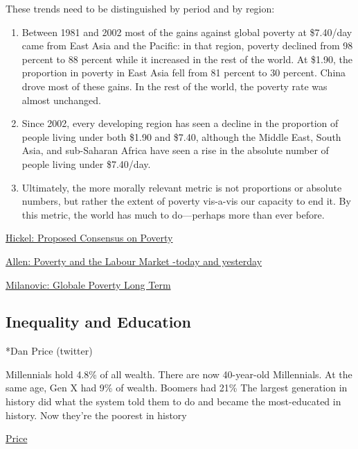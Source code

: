 \documentclass[
]{book}
\begin{document}
These trends need to be distinguished by period and by region:

\begin{enumerate}
\def\labelenumi{\arabic{enumi}.}
\setcounter{enumi}{7}
\item
  Between 1981 and 2002 most of the gains against global poverty at \$7.40/day came from East Asia and the Pacific: in that region, poverty declined from 98 percent to 88 percent while it increased in the rest of the world. At \$1.90, the proportion in poverty in East Asia fell from 81 percent to 30 percent. China drove most of these gains. In the rest of the world, the poverty rate was almost unchanged.
\item
  Since 2002, every developing region has seen a decline in the proportion of people living under both \$1.90 and \$7.40, although the Middle East, South Asia, and sub-Saharan Africa have seen a rise in the absolute number of people living under \$7.40/day.
\item
  Ultimately, the more morally relevant metric is not proportions or absolute numbers, but rather the extent of poverty vis-a-vis our capacity to end it. By this metric, the world has much to do---perhaps more than ever before.
\end{enumerate}

\href{https://www.cgdev.org/blog/12-things-we-can-agree-about-global-poverty}{Hickel: Proposed Consensus on Poverty}

\href{https://en.es1lib.org/book/11926264/191b2c}{Allen: Poverty and the Labour Market -today and yesterday}

\href{https://www.globalpolicyjournal.com/blog/11/02/2019/global-poverty-over-long-term-legitimate-issues}{Milanovic: Globale Poverty Long Term}

\hypertarget{inequality-and-education}{%
\subsection{Inequality and Education}\label{inequality-and-education}}

*Dan Price (twitter)

Millennials hold 4.8\% of all wealth. There are now 40-year-old Millennials.
At the same age, Gen X had 9\% of wealth. Boomers had 21\%
The largest generation in history did what the system told them to do and became the most-educated in history. Now they're the poorest in history

\href{https://twitter.com/DanPriceSeattle/status/1392571782155030530}{Price}
\end{document}
